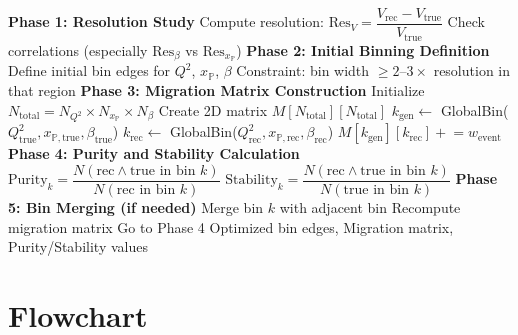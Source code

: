 \documentclass[11pt,a4paper]{article}
\begin{document}
\begin{algorithm}[H]
\caption{3D Binning Optimization Procedure}
\begin{algorithmic}[1]
\Statex \textbf{Phase 1: Resolution Study}
    \State Compute resolution: $\text{Res}_V = \dfrac{V_{\text{rec}} - V_{\text{true}}}{V_{\text{true}}}$
    \State Check correlations (especially $\text{Res}_\beta$ vs $\text{Res}_{x_\mathbb{P}}$)
\EndFor
\Statex
\Statex \textbf{Phase 2: Initial Binning Definition}
\State Define initial bin edges for $Q^2$, $x_\mathbb{P}$, $\beta$
\State Constraint: bin width $\geq 2\text{--}3 \times$ resolution in that region
\Statex
\Statex \textbf{Phase 3: Migration Matrix Construction}
\State Initialize $N_{\text{total}} = N_{Q^2} \times N_{x_\mathbb{P}} \times N_\beta$
\State Create 2D matrix $M[N_{\text{total}}][N_{\text{total}}]$
    \State $k_{\text{gen}} \gets$ GlobalBin($Q^2_{\text{true}}, x_{\mathbb{P},\text{true}}, \beta_{\text{true}}$)
    \State $k_{\text{rec}} \gets$ GlobalBin($Q^2_{\text{rec}}, x_{\mathbb{P},\text{rec}}, \beta_{\text{rec}}$)
    \State $M[k_{\text{gen}}][k_{\text{rec}}] \mathrel{+}= w_{\text{event}}$
\EndFor
\Statex
\Statex \textbf{Phase 4: Purity and Stability Calculation}
    \State $\text{Purity}_k = \dfrac{N(\text{rec} \land \text{true in bin } k)}{N(\text{rec in bin } k)}$
    \State $\text{Stability}_k = \dfrac{N(\text{rec} \land \text{true in bin } k)}{N(\text{true in bin } k)}$
\EndFor
\Statex
\Statex \textbf{Phase 5: Bin Merging (if needed)}
        \State Merge bin $k$ with adjacent bin
        \State Recompute migration matrix
        \State Go to Phase 4
    \EndIf
\EndFor
\Statex
\State \Return Optimized bin edges, Migration matrix, Purity/Stability values
\end{algorithmic}
\end{algorithm}

\newpage
\section{Flowchart}
\end{document}
